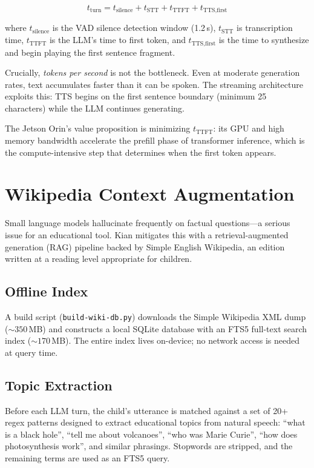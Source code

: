 \documentclass[11pt]{article}
\begin{document}
$$t_{\text{turn}} = t_{\text{silence}} + t_{\text{STT}} + t_{\text{TTFT}} + t_{\text{TTS,first}}$$

\noindent where $t_{\text{silence}}$ is the VAD silence detection window (1.2\,s), $t_{\text{STT}}$ is transcription time, $t_{\text{TTFT}}$ is the LLM's time to first token, and $t_{\text{TTS,first}}$ is the time to synthesize and begin playing the first sentence fragment.

Crucially, \emph{tokens per second} is not the bottleneck. Even at moderate generation rates, text accumulates faster than it can be spoken. The streaming architecture exploits this: TTS begins on the first sentence boundary (minimum 25 characters) while the LLM continues generating.

The Jetson Orin's value proposition is minimizing $t_{\text{TTFT}}$: its GPU and high memory bandwidth accelerate the prefill phase of transformer inference, which is the compute-intensive step that determines when the first token appears.

\section{Wikipedia Context Augmentation}

Small language models hallucinate frequently on factual questions---a serious issue for an educational tool.
Kian mitigates this with a retrieval-augmented generation (RAG) pipeline backed by Simple English Wikipedia, an edition written at a reading level appropriate for children.

\subsection{Offline Index}

A build script (\texttt{build-wiki-db.py}) downloads the Simple Wikipedia XML dump (${\sim}350$\,MB) and constructs a local SQLite database with an FTS5 full-text search index (${\sim}170$\,MB).
The entire index lives on-device; no network access is needed at query time.

\subsection{Topic Extraction}

Before each LLM turn, the child's utterance is matched against a set of 20+ regex patterns designed to extract educational topics from natural speech: ``what is a black hole'', ``tell me about volcanoes'', ``who was Marie Curie'', ``how does photosynthesis work'', and similar phrasings.
Stopwords are stripped, and the remaining terms are used as an FTS5 query.
\end{document}
